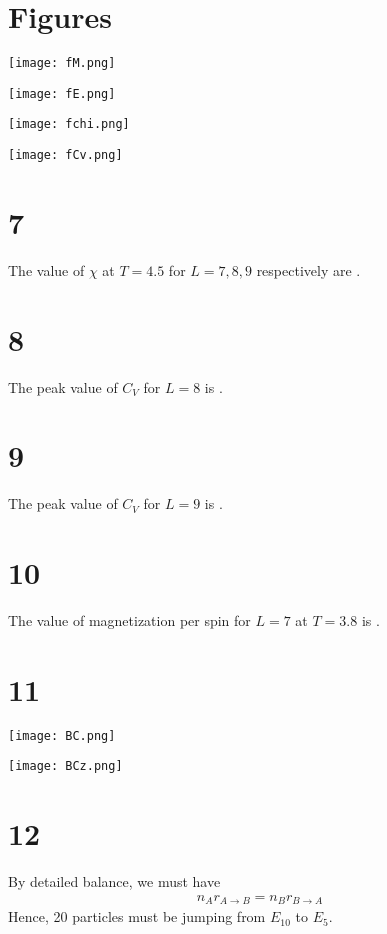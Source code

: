\documentclass{article}
\begin{document}
\section*{Figures}

\begin{center}
    \texttt{[image: fM.png]}
\end{center}

\begin{center}
    \texttt{[image: fE.png]}
\end{center}

\begin{center}
    \texttt{[image: fchi.png]}
\end{center}

\begin{center}
    \texttt{[image: fCv.png]}
\end{center}

\section*{7}

The value of $\chi$ at $T=4.5$ for $L=7, 8, 9$ respectively are .

\section*{8}

The peak value of $C_V$ for $L = 8$ is .

\section*{9}

The peak value of $C_V$ for $L = 9$ is .

\section*{10}

The value of magnetization per spin for $L=7$ at $T=3.8$ is .

\section*{11}

\begin{center}
    \texttt{[image: BC.png]}
\end{center}

\begin{center}
    \texttt{[image: BCz.png]}
\end{center}

\section*{12}

By detailed balance, we must have
\begin{align*}
    n_A r_{A \to B} = n_B r_{B \to A}
\end{align*}
Hence, 20 particles must be jumping from $E_{10}$ to $E_5$.
\end{document}
